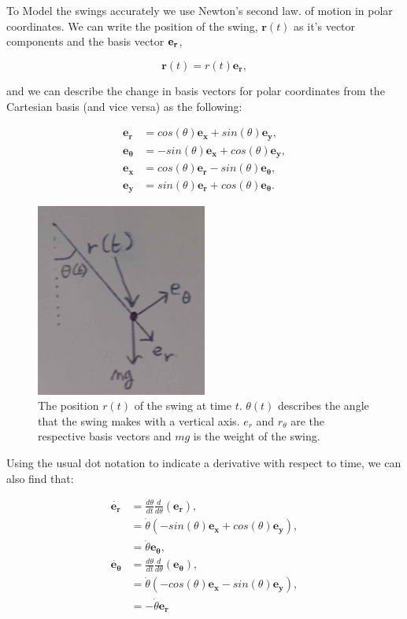 \documentclass[12pt]{article}
\begin{document}
To Model the swings accurately we use Newton's second law. %
of motion in polar coordinates. We can write the position of the swing, $\mathbf{r} (t)$ 
as it's vector components and the basis vector $\bf{e_r}$,

$$\mathbf{r}(t) = r(t)\mathbf{e_r},$$

and we can describe the change in basis vectors for polar coordinates from the Cartesian basis (and vice versa) as the following:

\begin{align}
    \mathbf{e_r} &= cos(\theta) \mathbf{e_x} + sin(\theta) \mathbf{e_y}, \\
    \mathbf{e_\theta} &= -sin(\theta) \mathbf{e_x} + cos(\theta) \mathbf{e_y},\\
    \mathbf{e_x} &= cos(\theta)\mathbf{e_r} - sin(\theta) \mathbf{e_\theta},\\
    \mathbf{e_y} &= sin(\theta) \mathbf{e_r} + cos(\theta) \mathbf{e_\theta}.
\end{align}


\begin{figure}[H]
    \centering
    \includegraphics[width=0.5\textwidth]{Figures/Swing.png}
    \caption{The position $r(t)$ of the swing at time $t$. $\theta(t)$ describes the angle that the swing makes with a vertical axis. $e_r$ and $r_\theta$ are the respective basis vectors and $mg$ is the weight of the swing.}
    \label{fig1}
\end{figure}

Using the usual dot notation to indicate a derivative with respect to time, we can also find that:

\begin{align}
    \dot{\mathbf{e_r}} &= \frac{d\theta}{dt} \frac{d}{d\theta}(\mathbf{e_r}),\\
    &= \dot{\theta}(-sin(\theta) \mathbf{e_x} + cos(\theta) \mathbf{e_y}),\\
    &= \dot{\theta}\mathbf{e_\theta},\\
    \dot{\mathbf{e_\theta}} &= \frac{d\theta}{dt} \frac{d}{d\theta}(\mathbf{e_\theta}),\\
    &= \dot{\theta} (-cos(\theta) \mathbf{e_x} - sin(\theta) \mathbf{e_y}),\\
    &= -\dot{\theta} \mathbf{e_r}
\end{align}
\end{document}
